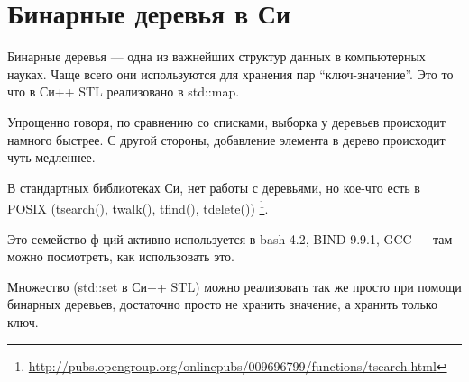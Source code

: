 \section{Бинарные деревья в Си}

Бинарные деревья --- одна из важнейших структур данных в компьютерных науках.
Чаще всего они используются для хранения пар ``ключ-значение''. Это то что в Си++ STL реализовано в std::map.

Упрощенно говоря, по сравнению со списками, выборка у деревьев происходит намного быстрее.
С другой стороны, добавление элемента в дерево происходит чуть медленнее.

В стандартных библиотеках Си, нет работы с деревьями, но кое-что есть в POSIX 
(tsearch(), twalk(), tfind(), tdelete())
\footnote{\url{http://pubs.opengroup.org/onlinepubs/009696799/functions/tsearch.html}}.

Это семейство ф-ций активно используется в bash 4.2, BIND 9.9.1, GCC --- там можно посмотреть, как использовать
это.

Множество (std::set в Си++ STL) можно реализовать так же просто при помощи бинарных деревьев, достаточно
просто не хранить значение, а хранить только ключ.


